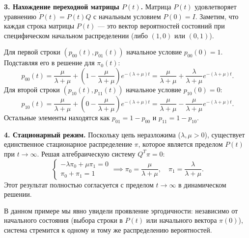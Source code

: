 \begin{eproof}
    \textbf{3. Нахождение переходной матрицы $P(t)$.}
    Матрица $P(t)$ удовлетворяет уравнению $\dot{P}(t) = P(t)Q$ с начальным условием $P(0) = I$. Заметим, что каждая строка матрицы $P(t)$ — это вектор вероятностей состояний при специфическом начальном распределении (либо $(1, 0)$ или $(0, 1)$). 
    
    Для первой строки $(p_{00}(t), p_{01}(t))$ начальное условие $p_{00}(0) = 1$. Подставляя его в решение для $\pi_0(t)$:
    \begin{equation}
        p_{00}(t) = \frac{\mu}{\lambda + \mu} + \left( 1 - \frac{\mu}{\lambda + \mu} \right) e^{-(\lambda + \mu)t} = \frac{\mu}{\lambda + \mu} + \frac{\lambda}{\lambda + \mu} e^{-(\lambda + \mu)t}.
    \end{equation}
    Для второй строки $(p_{10}(t), p_{11}(t))$ начальное условие $p_{10}(0) = 0$:
    \begin{equation}
        p_{10}(t) = \frac{\mu}{\lambda + \mu} + \left( 0 - \frac{\mu}{\lambda + \mu} \right) e^{-(\lambda + \mu)t} = \frac{\mu}{\lambda + \mu} - \frac{\mu}{\lambda + \mu} e^{-(\lambda + \mu)t}.
    \end{equation}
    Остальные элементы находятся как $p_{01} = 1 - p_{00}$ и $p_{11} = 1 - p_{10}$.

    \textbf{4. Стационарный режим.}
    Поскольку цепь неразложима ($\lambda, \mu > 0$), существует единственное стационарное распределение $\pi$, которое является пределом $P(t)$ при $t \to \infty$. Решая алгебраическую систему $Q^T \pi = 0$:
    \begin{equation}
        \begin{cases} 
            -\lambda \pi_0 + \mu \pi_1 = 0 \\ 
            \pi_0 + \pi_1 = 1 
        \end{cases} \implies
        \pi_0 = \frac{\mu}{\lambda + \mu}, \quad \pi_1 = \frac{\lambda}{\lambda + \mu}.
    \end{equation}
    Этот результат полностью согласуется с пределом $t \to \infty$ в динамическом решении.
\end{eproof}

\begin{note}
    В данном примере мы явно увидели проявление эргодичности: независимо от начального состояния (выбора строки в $P(t)$ или начального вектора $\pi(0)$), система стремится к одному и тому же распределению вероятностей.
\end{note}

